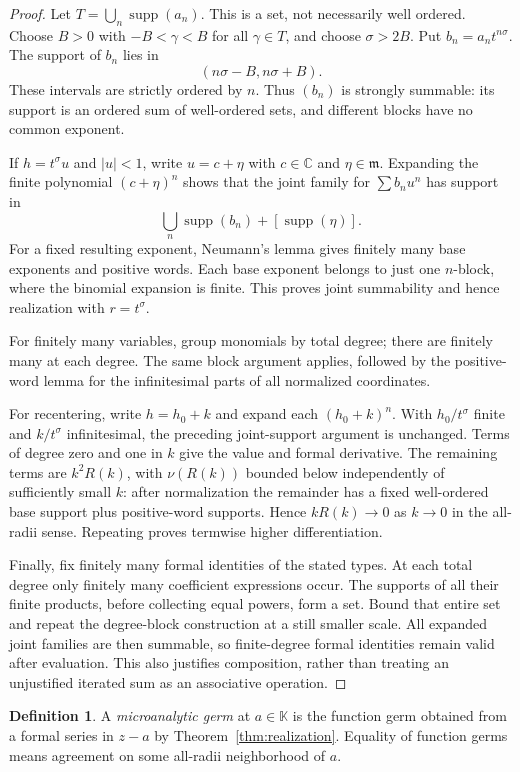 \documentclass[11pt,oneside]{article}
\theoremstyle{definition}\newtheorem{definition}[theorem]{Definition}
\newcommand{\K}{\mathbb K}
\newcommand{\C}{\mathbb C}
\newcommand{\mm}{\mathfrak m}
\newcommand{\supp}{\operatorname{supp}}
\newcommand{\val}{\nu}
\begin{document}
\begin{proof}
Let $T=\bigcup_n\supp(a_n)$. This is a set, not necessarily well ordered. Choose $B>0$ with $-B<\gamma<B$ for all $\gamma\in T$, and choose $\sigma>2B$. Put $b_n=a_nt^{n\sigma}$. The support of $b_n$ lies in
\[
 (n\sigma-B,n\sigma+B).
\]
These intervals are strictly ordered by $n$. Thus $(b_n)$ is strongly summable: its support is an ordered sum of well-ordered sets, and different blocks have no common exponent.

If $h=t^\sigma u$ and $|u|<1$, write $u=c+\eta$ with $c\in\C$ and $\eta\in\mm$. Expanding the finite polynomial $(c+\eta)^n$ shows that the joint family for $\sum b_nu^n$ has support in
\[
 \bigcup_n\supp(b_n)+[\supp(\eta)].
\]
For a fixed resulting exponent, Neumann's lemma gives finitely many base exponents and positive words. Each base exponent belongs to just one $n$-block, where the binomial expansion is finite. This proves joint summability and hence realization with $r=t^\sigma$.

For finitely many variables, group monomials by total degree; there are finitely many at each degree. The same block argument applies, followed by the positive-word lemma for the infinitesimal parts of all normalized coordinates.

For recentering, write $h=h_0+k$ and expand each $(h_0+k)^n$. With $h_0/t^\sigma$ finite and $k/t^\sigma$ infinitesimal, the preceding joint-support argument is unchanged. Terms of degree zero and one in $k$ give the value and formal derivative. The remaining terms are $k^2R(k)$, with $\val(R(k))$ bounded below independently of sufficiently small $k$: after normalization the remainder has a fixed well-ordered base support plus positive-word supports. Hence $kR(k)\to0$ as $k\to0$ in the all-radii sense. Repeating proves termwise higher differentiation.

Finally, fix finitely many formal identities of the stated types. At each total degree only finitely many coefficient expressions occur. The supports of all their finite products, before collecting equal powers, form a set. Bound that entire set and repeat the degree-block construction at a still smaller scale. All expanded joint families are then summable, so finite-degree formal identities remain valid after evaluation. This also justifies composition, rather than treating an unjustified iterated sum as an associative operation.
\end{proof}

\begin{definition}
A \emph{microanalytic germ} at $a\in\K$ is the function germ obtained from a formal series in $z-a$ by Theorem~\ref{thm:realization}. Equality of function germs means agreement on some all-radii neighborhood of $a$.
\end{definition}
\end{document}
